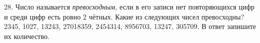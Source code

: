 28. Число называется {\it превосходным,} если в его записи нет повторяющихся цифр и среди цифр есть ровно 2 чётных. Какие из следующих чисел превосходны? 2345, 1027, 13243, 27018359, 2454314, 8956703, 13247, 305709. В ответ запишите их количество.\\
